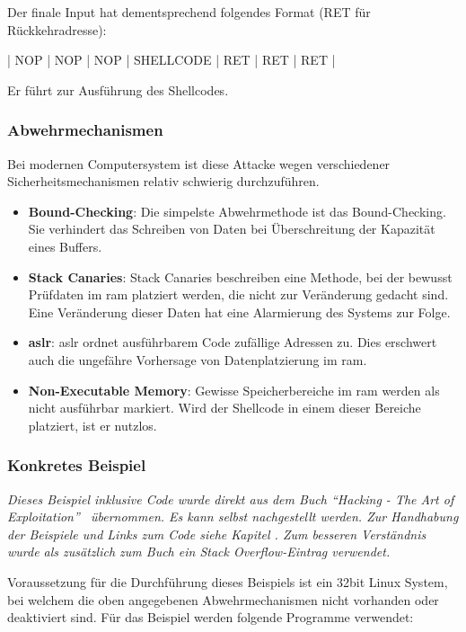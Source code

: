 \documentclass[11pt, a4paper]{article}
\begin{document}
Der finale Input hat dementsprechend folgendes Format (RET für Rückkehradresse):
\newline
\begin{center}
	\centerline{| NOP | NOP | NOP | SHELLCODE | RET | RET | RET |}
\end{center}
Er führt zur Ausführung des Shellcodes.

\subsubsection{Abwehrmechanismen}\label{subsubsec:abwehrbuffer-overflow}
Bei modernen Computersystem ist diese Attacke wegen verschiedener Sicherheitsmechanismen relativ schwierig durchzuführen.

\begin{itemize}
	\item \textbf{Bound-Checking}: Die simpelste Abwehrmethode ist das Bound-Checking. Sie verhindert das Schreiben von Daten bei Überschreitung der Kapazität eines Buffers.
	\item \textbf{Stack Canaries}: Stack Canaries beschreiben eine Methode, bei der bewusst Prüfdaten im \gls{ram} platziert werden, die nicht zur Veränderung gedacht sind. Eine Veränderung dieser Daten hat eine Alarmierung des Systems zur Folge.~\cite{StackCan84:online}
	\item \textbf{\gls{aslr}}: \gls{aslr} ordnet ausführbarem Code zufällige Adressen zu. Dies erschwert auch die ungefähre Vorhersage von Datenplatzierung im \gls{ram}.~\cite{Whatisad68:online}
	\item \textbf{Non-Executable Memory}: Gewisse Speicherbereiche im \gls{ram} werden als nicht ausführbar markiert. Wird der Shellcode in einem dieser Bereiche platziert, ist er nutzlos.
\end{itemize}


\subsubsection{Konkretes Beispiel}\label{subsubsec:bspbuffer-overflow}
\textit{Dieses Beispiel inklusive Code wurde direkt aus dem Buch ``Hacking - The Art of Exploitation''~\cite{erickson2008hacking} übernommen. Es kann selbst nachgestellt werden. Zur Handhabung der Beispiele und Links zum Code siehe Kapitel . Zum besseren Verständnis wurde als zusätzlich zum Buch ein Stack Overflow-Eintrag verwendet.~\cite{stacko:online}}

Voraussetzung für die Durchführung dieses Beispiels ist ein 32bit Linux System, bei welchem die oben angegebenen Abwehrmechanismen nicht vorhanden oder deaktiviert sind. Für das Beispiel werden folgende Programme verwendet:
\end{document}

